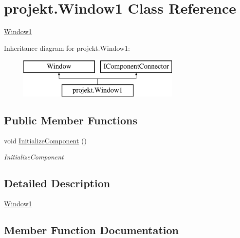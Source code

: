 \hypertarget{classprojekt_1_1_window1}{}\section{projekt.\+Window1 Class Reference}
\label{classprojekt_1_1_window1}


\mbox{\hyperlink{classprojekt_1_1_window1}{Window1}}  


Inheritance diagram for projekt.\+Window1\+:\begin{figure}[H]
\begin{center}
\leavevmode
\includegraphics[height=2.000000cm]{classprojekt_1_1_window1}
\end{center}
\end{figure}
\subsection*{Public Member Functions}
\begin{DoxyCompactItemize}
\item 
void \mbox{\hyperlink{classprojekt_1_1_window1_ad2061a2a9cf03f45616950cf16a0784c}{Initialize\+Component}} ()
\begin{DoxyCompactList}\small\item\em Initialize\+Component \end{DoxyCompactList}\end{DoxyCompactItemize}


\subsection{Detailed Description}
\mbox{\hyperlink{classprojekt_1_1_window1}{Window1}} 



\subsection{Member Function Documentation}
\mbox{\label{classprojekt_1_1_window1_ad2061a2a9cf03f45616950cf16a0784c}} 
